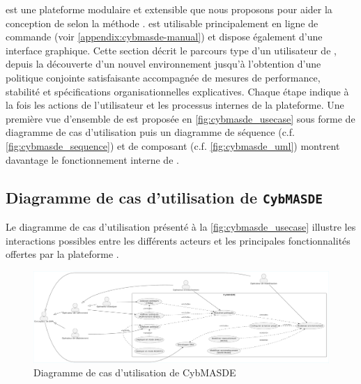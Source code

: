 \footnotemark[1] est une plateforme modulaire et extensible que nous proposons pour aider la conception de  selon la méthode .  est utilisable principalement en ligne de commande (voir \autoref{appendix:cybmasde-manual}) et dispose également d'une interface graphique.
Cette section décrit le parcours type d'un utilisateur de , depuis la découverte d'un nouvel environnement jusqu'à l'obtention d'une politique conjointe satisfaisante accompagnée de mesures de performance, stabilité et spécifications organisationnelles explicatives. Chaque étape indique à la fois les actions de l'utilisateur et les processus internes de la plateforme. Une première vue d'ensemble de  est proposée en \autoref{fig:cybmasde_usecase} sous forme de diagramme de cas d'utilisation puis un diagramme de séquence (c.f. \autoref{fig:cybmasde_sequence}) et de composant (c.f. \autoref{fig:cybmasde_uml}) montrent davantage le fonctionnement interne de .

\subsection{Diagramme de cas d'utilisation de \texttt{CybMASDE}}

Le diagramme de cas d’utilisation présenté à la \autoref{fig:cybmasde_usecase} illustre les interactions possibles entre les différents acteurs et les principales fonctionnalités offertes par la plateforme .

\begin{figure}
  \centering
  \includegraphics[width=\linewidth]{figures/use_case_cybmasde.pdf}
  \caption{Diagramme de cas d'utilisation de CybMASDE}
  \label{fig:cybmasde_usecase}
\end{figure}

